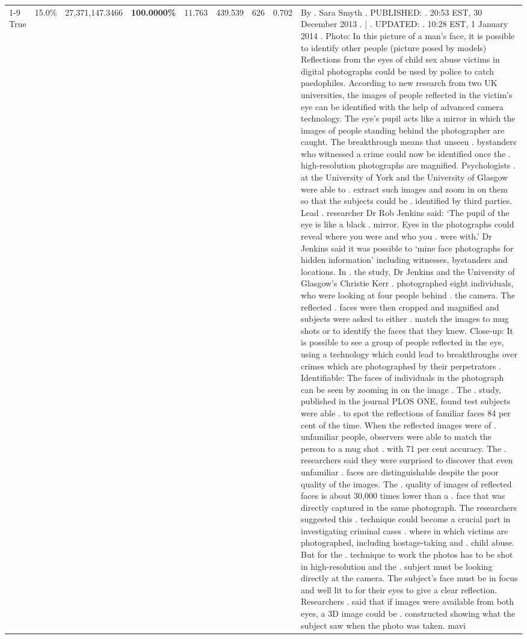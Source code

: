 \begin{table}[H]
\begin{tabular}{lllrlllll}
\cline{1-9}
True & 15.0\% & 27,371,147.3466 & \bfseries \color{red} 100.0000\% & 11.763 & 439.539 & 626 & 0.702 & By . Sara Smyth . PUBLISHED: . 20:53 EST, 30 December 2013 . | . UPDATED: . 10:28 EST, 1 January 2014 . Photo: In this picture of a man's face, it is possible to identify other people (picture posed by models) Reflections from the eyes of child sex abuse victims in digital photographs could be used by police to catch paedophiles. According to new research from two UK universities, the images of people reflected in the victim's eye can be identified with the help of advanced camera technology. The eye's pupil acts like a mirror in which the images of people standing behind the photographer are caught. The breakthrough means that unseen . bystanders who witnessed a crime could now be identified once the . high-resolution photographs are magnified. Psychologists . at the University of York and the University of Glasgow were able to . extract such images and zoom in on them so that the subjects could be . identified by third parties. Lead . researcher Dr Rob Jenkins said: ‘The pupil of the eye is like a black . mirror. Eyes in the photographs could reveal where you were and who you . were with.' Dr Jenkins said it was possible to ‘mine face photographs for hidden information' including witnesses, bystanders and locations. In . the study, Dr Jenkins and the University of Glasgow's Christie Kerr . photographed eight individuals, who were looking at four people behind . the camera. The reflected . faces were then cropped and magnified and subjects were asked to either . match the images to mug shots or to identify the faces that they knew. Close-up: It is possible to see a group of people reflected in the eye, using a technology which could lead to breakthroughs over crimes which are photographed by their perpetrators . Identifiable: The faces of individuals in the photograph can be seen by zooming in on the image . The . study, published in the journal PLOS ONE, found test subjects were able . to spot the reflections of familiar faces 84 per cent of the time. When the reflected images were of . unfamiliar people, observers were able to match the person to a mug shot . with 71 per cent accuracy. The . researchers said they were surprised to discover that even unfamiliar . faces are distinguishable despite the poor quality of the images. The . quality of images of reflected faces is about 30,000 times lower than a . face that was directly captured in the same photograph. The researchers suggested this . technique could become a crucial part in investigating criminal cases . where in which victims are photographed, including hostage-taking and . child abuse. But for the . technique to work the photos has to be shot in high-resolution and the . subject must be looking directly at the camera. The subject's face must be in focus and well lit to for their eyes to give a clear reflection. Researchers . said that if images were available from both eyes, a 3D image could be . constructed showing what the subject saw when the photo was taken. mavi \\

\end{tabular}
\end{table}
